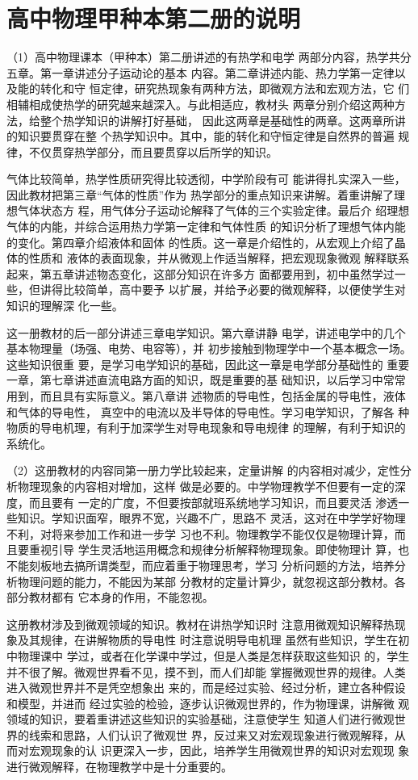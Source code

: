 \chapter{高中物理甲种本第二册的说明}

（1）高中物理课本（甲种本）第二册讲述的有热学和电学
两部分内容，热学共分五章。第一章讲述分子运动论的基本
内容。第二章讲述内能、热力学第一定律以及能的转化和守
恒定律，研究热现象有两种方法，即微观方法和宏观方法，它
们相辅相成使热学的研究越来越深入。与此相适应，教材头
两章分别介绍这两种方法，给整个热学知识的讲解打好基础，
因此这两章是基础性的两章。这两章所讲的知识要贯穿在整
个热学知识中。其中，能的转化和守恒定律是自然界的普遍
规律，不仅贯穿热学部分，而且要贯穿以后所学的知识。

气体比较简单，热学性质研究得比较透彻，中学阶段有可
能讲得扎实深入一些，因此教材把第三章“气体的性质”作为
热学部分的重点知识来讲解。着重讲解了理想气体状态方
程，用气体分子运动论解释了气体的三个实验定律。最后介
绍理想气体的内能，并综合运用热力学第一定律和气体性质
的知识分析了理想气体内能的变化。第四章介绍液体和固体
的性质。这一章是介绍性的，从宏观上介绍了晶体的性质和
液体的表面现象，并从微观上作适当解释，把宏观现象微观
解释联系起来，第五章讲述物态变化，这部分知识在许多方
面都要用到，初中虽然学过一些，但讲得比较简单，高中要予
以扩展，并给予必要的微观解释，以便使学生对知识的理解深
化一些。

这一册教材的后一部分讲述三章电学知识。第六章讲静
电学，讲述电学中的几个基本物理量（场强、电势、电容等），并
初步接触到物理学中一个基本概念一场。这些知识很重
要，是学习电学知识的基础，因此这一章是电学部分基础性的
重要一章，第七章讲述直流电路方面的知识，既是重要的基
础知识，以后学习中常常用到，而且具有实际意义。第八章讲
述物质的导电性，包括金属的导电性，液体和气体的导电性，
真空中的电流以及半导体的导电性。学习电学知识，了解各
种物质的导电机理，有利于加深学生对导电现象和导电规律
的理解，有利于知识的系统化。

（2）这册教材的内容同第一册力学比较起来，定量讲解
的内容相对减少，定性分析物理现象的内容相对增加，这样
做是必要的。中学物理教学不但要有一定的深度，而且要有
一定的广度，不但要按部就班系统地学习知识，而且要灵活
渗透一些知识。学知识面窄，眼界不宽，兴趣不广，思路不
灵活，这对在中学学好物理不利，对将来参加工作和进一步学
习也不利。物理教学不能仅仅是物理计算，而且要重视引导
学生灵活地运用概念和规律分析解释物理现象。即使物理计
算，也不能刻板地去搞所谓类型，而应着重于物理思考，学习
分析问题的方法，培养分析物理问题的能力，不能因为某部
分教材的定量计算少，就忽视这部分教材。各部分教材都有
它本身的作用，不能忽视。

这册教材涉及到微观领域的知识。教材在讲热学知识时
注意用微观知识解释热现象及其规律，在讲解物质的导电性
时注意说明导电机理 虽然有些知识，学生在初中物理课中
学过，或者在化学课中学过，但是人类是怎样获取这些知识
的，学生并不很了解。微观世界看不见，摸不到，而人们却能
掌握微观世界的规律。人类进入微观世界并不是凭空想象出
来的，而是经过实验、经过分析，建立各种假设和模型，并进而
经过实验的检验，逐步认识微观世界的，作为物理课，讲解微
观领域的知识，要着重讲述这些知识的实验基础，注意使学生
知道人们进行微观世界的线索和思路，人们认识了微观世
界，反过来又对宏观现象进行微观解释，从而对宏观现象的认
识更深入一步，因此，培养学生用微观世界的知识对宏观现
象进行微观解释，在物理教学中是十分重要的。

